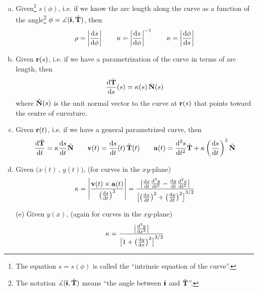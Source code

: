 \begin{theorem}\label{thm:curvatureFormulae}

\begin{enumerate}[(a)]
\item 
Given\footnote{The equation $s=s(\phi)$ is called the ``intrinsic 
equation of the curve''.} $s(\phi)$,
i.e. if we know the arc length along the curve as a function of 
the angle\footnote{The notation $\measuredangle(\hat{\pmb{\imath}},\hat{\mathbf{T}})$
means ``the angle between $\hat{\pmb{\imath}}$ and $\hat{\mathbf{T}}$''.} 
$\phi=\measuredangle(\hat{\pmb{\imath}},\hat{\mathbf{T}})$, then
\begin{equation*}
\rho = \left|\diff{s}{\phi}\right|\qquad
\ka = \left|\diff{s}{\phi}\right|^{-1}\qquad
\ka = \left|\diff{\phi}{s}\right|
\end{equation*}

\item\label{thm:curvatureFormulae:part:b}
Given $\mathbf{r}(s)$,
i.e. if we have a parametrization of the curve in terms of arc length, then
\begin{equation*}
\diff{\hat\vT}{s}(s) = \ka(s)\,\hat\vN(s)
\end{equation*}
where $\hat{\mathbf{N}}(s)$ is the unit normal vector to the curve at $\mathbf{r}(s)$
that points toward the centre of curvature.

\item\label{thm:curvatureFormulae:part:c}
Given $\mathbf{r}(t)$, i.e. if we have a general parametrized curve,
then
\begin{align*}
\diff{\hat\vT}{t} = \ka \diff{s}{t} \hat\vN\qquad
\vv(t) =  \diff{s}{t}(t)\,\hat\vT(t) \qquad
\va(t) %
       =  \difftwo{s}{t}\hat\vT
                           + \ka\left(\diff{s}{t}\right)^2\hat\vN
\end{align*}

\item 
Given $\big(x(t)\,,\,y(t)\big)$, (for curves in the $xy$-plane)
\begin{equation*}
\ka = \left|\frac{\vv(t)\times\va(t)}{\big(\diff{s}{t}\big)^3}\right|
=\frac{\big|\diff{x}{t}\difftwo{y}{t}-\diff{y}{t}\difftwo{x}{t}\big|}
{ {\big[\big(\diff{x}{t}\big)^2+\big(\diff{y}{t}\big)^2\big]}^{3/2} }
\end{equation*}

\end{enumerate}
\end{theorem}

\addtocounter{theorem}{-1}
\begin{theorem}[continued]
\begin{enumerate}[(a)]


\item[(e)]\label{thm:curvatureFormulae:part:e}
Given $y(x)$, (again for curves in the $xy$-plane)
\begin{equation*}
\ka 
=\frac{\big|\difftwo{y}{x}\big|}
{ {\big[1+\big(\diff{y}{x}\big)^2\big]}^{3/2} }
\end{equation*}

\end{enumerate}
\end{theorem}

